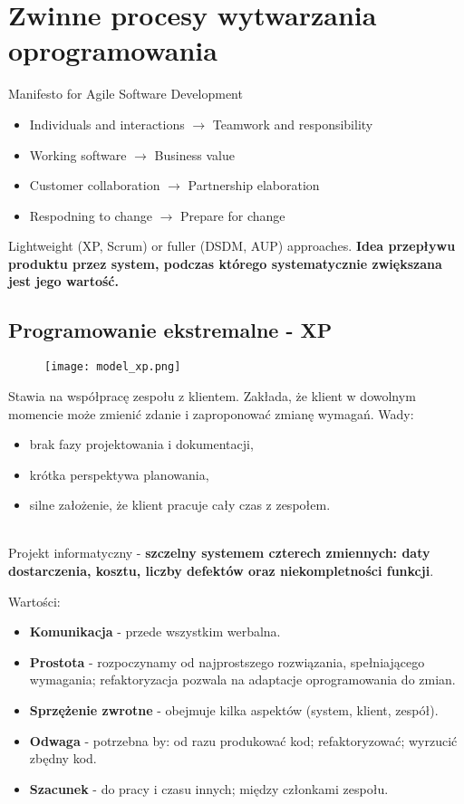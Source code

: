 \documentclass[a4paper]{article}
\begin{document}
    \section{Zwinne procesy wytwarzania oprogramowania}
    Manifesto for Agile Software Development
    \begin{itemize}
        \item Individuals and interactions $\rightarrow$ Teamwork and responsibility
        \item Working software $\rightarrow$ Business value
        \item Customer collaboration $\rightarrow$ Partnership elaboration
        \item Respodning to change $\rightarrow$ Prepare for change
    \end{itemize}

    Lightweight (XP, Scrum) or fuller (DSDM, AUP) approaches.
    \textbf{Idea przepływu produktu przez system, podczas którego systematycznie zwiększana jest jego wartość.}

    \subsection{Programowanie ekstremalne - XP}
    \begin{figure}[H]
        \texttt{[image: model\_xp.png]}
    \end{figure}

    Stawia na współpracę zespołu z klientem. Zakłada, że klient w dowolnym momencie może
    zmienić zdanie i zaproponować zmianę wymagań.
    Wady:
    \begin{itemize}
        \item brak fazy projektowania i dokumentacji,
        \item krótka perspektywa planowania,
        \item silne założenie, że klient pracuje cały czas z zespołem.
    \end{itemize}
    \hfill \\

    Projekt informatyczny - \textbf{szczelny systemem czterech zmiennych: daty dostarczenia, kosztu, liczby
    defektów oraz niekompletności funkcji}.

    Wartości:
    \begin{itemize}
        \item \textbf{Komunikacja} - przede wszystkim werbalna.
        \item \textbf{Prostota} - rozpoczynamy od najprostszego rozwiązania, spełniającego
        wymagania; refaktoryzacja pozwala na adaptacje oprogramowania do zmian.
        \item \textbf{Sprzężenie zwrotne} - obejmuje kilka aspektów (system, klient, zespół).
        \item \textbf{Odwaga} - potrzebna by: od razu produkować kod; refaktoryzować; wyrzucić zbędny kod.
        \item \textbf{Szacunek} - do pracy i czasu innych; między członkami zespołu.
    \end{itemize}
\end{document}
